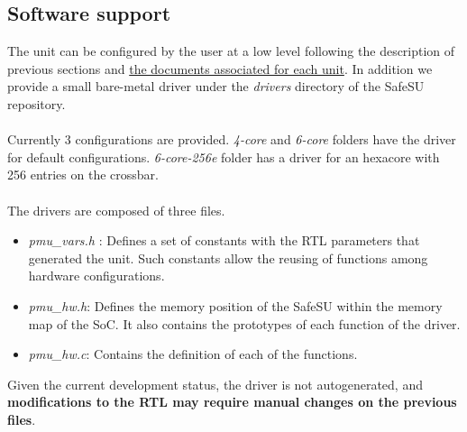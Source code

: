 \subsection{Software support}
The unit can be configured by the user at a low level following the description of previous sections and \href{https://gitlab.bsc.es/caos_hw/hdl_ip/bsc_pmu/-/tree/develop/docs}{the documents associated for each unit}. In addition we provide a small bare-metal driver under the \textit{drivers} directory of the SafeSU repository.\\
\\
Currently 3 configurations are provided. \textit{4-core} and \textit{6-core} folders have the driver for default configurations. \textit{6-core-256e} folder has a driver for an hexacore with 256 entries on the crossbar.\\
\\
The drivers are composed of three files.
\begin{itemize}
\item \textit{pmu\_vars.h }: Defines a set of constants with the RTL parameters that generated the unit. Such constants allow the reusing of functions among hardware configurations.
\item\textit{ pmu\_hw.h}: Defines the memory position of the SafeSU within the memory map of the SoC. It also contains the prototypes of each function of the driver.
\item \textit{pmu\_hw.c}: Contains the definition of each of the functions.
\end{itemize}
Given the current development status, the driver is not autogenerated, and \textbf{modifications to the RTL may require manual changes on the previous files}. 

